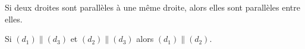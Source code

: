 Si deux droites sont parallèles à une même droite, alors elles sont parallèles entre elles.
\begin{center}
    Si $(d_1)\parallel(d_3)$ et $(d_2)\parallel(d_3)$ alors $(d_1)\parallel(d_2)$.
\end{center}